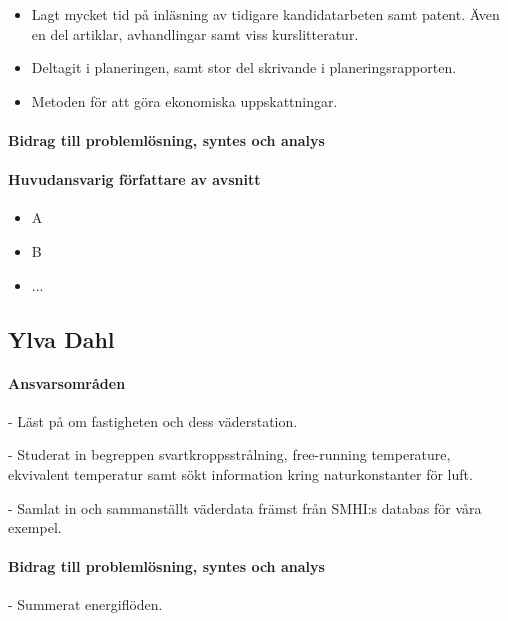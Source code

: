 \documentclass[12pt,a4paper]{article}
\begin{document}
\begin{itemize}
\item Lagt mycket tid på inläsning av tidigare kandidatarbeten samt patent. Även en del artiklar, avhandlingar samt viss kurslitteratur. 
\item Deltagit i planeringen, samt stor del skrivande i planeringsrapporten.
\item Metoden för att göra ekonomiska uppskattningar.
\end{itemize}


\paragraph{Bidrag till problemlösning, syntes och analys}

\paragraph{Huvudansvarig författare av avsnitt}



\begin{itemize}
\item A
\item B
\item ...
\end{itemize}




\subsection*{Ylva Dahl}

\paragraph{Ansvarsområden}

\item[-] Läst på om fastigheten och dess väderstation.
\item[-] Studerat in begreppen svartkroppsstrålning, free-running temperature, ekvivalent temperatur samt sökt information kring naturkonstanter för luft.
\item[-] Samlat in och sammanställt väderdata främst från SMHI:s databas för våra exempel.

\paragraph{Bidrag till problemlösning, syntes och analys}
\item[-] Summerat energiflöden.
\end{document}
